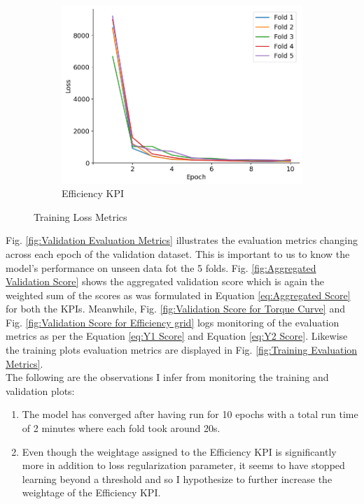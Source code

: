 \documentclass{report} %
\begin{document}
\begin{figure}[H]
\begin{subfigure}{0.32\textwidth}
        \centering
        \includegraphics[width=\textwidth]{./ReportImages/train_loss_y2.png}
        \caption{\centering Efficiency \ac{KPI}}
        \label{fig:Training Loss for Efficiency grid}
    \end{subfigure}
    \caption{Training Loss Metrics}
    \label{fig:Training Loss Metrics}
\end{figure}

Fig. \ref{fig:Validation Evaluation Metrics} illustrates the evaluation metrics changing across each epoch of the validation dataset. This is important to us to know 
the model's performance on unseen data fot the 5 folds. Fig. \ref{fig:Aggregated Validation Score} shows the aggregated validation score which is again the weighted 
sum of the scores as was formulated in Equation \ref{eq:Aggregated Score} for both the \ac{KPI}s.
Meanwhile, Fig. \ref{fig:Validation Score for Torque Curve} and Fig. \ref{fig:Validation Score for Efficiency grid} logs monitoring of the evaluation metrics as per the 
Equation \ref{eq:Y1 Score} and Equation \ref{eq:Y2 Score}.
Likewise the training plots evaluation metrics are displayed in Fig. \ref{fig:Training Evaluation Metrics}.\\

The following are the observations I infer from monitoring the training and validation plots:

\begin{enumerate}[nosep]
    \item The model has converged after having run for 10 epochs with a total run time of 2 minutes where each fold took around 20s.
    \item Even though the weightage assigned to the Efficiency \ac{KPI} is significantly more in addition to loss regularization parameter, it seems to have stopped learning 
    beyond a threshold and so I hypothesize to further increase the weightage of the Efficiency \ac{KPI}.
\end{enumerate}
\end{document}
